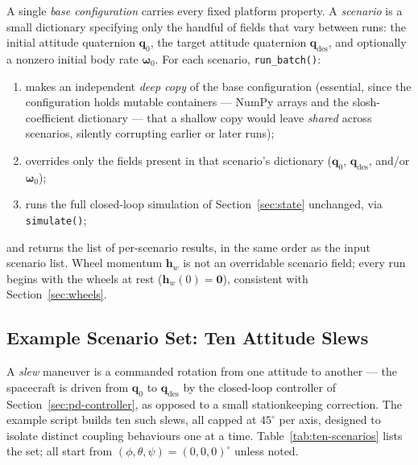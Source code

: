 A single \emph{base configuration} carries every fixed platform property.
A \emph{scenario} is a small dictionary specifying only the handful of
fields that vary between runs: the initial attitude quaternion
$\bm{q}_0$, the target attitude quaternion $\bm{q}_{\text{des}}$, and
optionally a nonzero initial body rate $\bm{\omega}_0$. For each scenario,
\texttt{run\_batch()}:
\begin{enumerate}\setlength{\itemsep}{2pt}
  \item makes an independent \emph{deep copy} of the base configuration
        (essential, since the configuration holds mutable containers ---
        NumPy arrays and the slosh-coefficient dictionary --- that a
        shallow copy would leave \emph{shared} across scenarios, silently
        corrupting earlier or later runs);
  \item overrides only the fields present in that scenario's dictionary
        ($\bm{q}_0$, $\bm{q}_{\text{des}}$, and/or $\bm{\omega}_0$);
  \item runs the full closed-loop simulation of Section~\ref{sec:state}
        unchanged, via \texttt{simulate()};
\end{enumerate}
and returns the list of per-scenario results, in the same order as the
input scenario list. Wheel momentum $\bm{h}_w$ is not an overridable
scenario field; every run begins with the wheels at rest
($\bm{h}_w(0)=\bm{0}$), consistent with Section~\ref{sec:wheels}.

\subsection{Example Scenario Set: Ten Attitude Slews}
\label{sec:batch-example}

A \emph{slew} maneuver is a commanded rotation from one attitude to
another --- the spacecraft is driven from $\bm{q}_0$ to
$\bm{q}_{\text{des}}$ by the closed-loop controller of
Section~\ref{sec:pd-controller}, as opposed to a small stationkeeping
correction. The example script builds ten such slews, all capped at
$45^\circ$ per axis, designed to isolate distinct coupling behaviours
one at a time. Table~\ref{tab:ten-scenarios} lists the set; all start
from $(\phi,\theta,\psi) = (0,0,0)^\circ$ unless noted.

